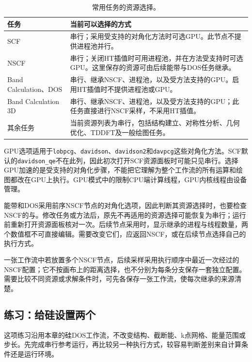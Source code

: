 \begin{table}[!htb]
\centering
\caption{常用任务的资源选择。}
\label{tab:node-resource-support}
\begin{tabularx}{\linewidth}{p{.29\linewidth}X}
\toprule
任务 & 当前可以选择的方式 \\
\midrule
SCF & 串行；采用受支持的对角化方法时可选GPU。此节点不提供进程池并行。\\
NSCF & 串行；关闭HT插值时可用进程池，并在方法受支持时可选GPU。这里保存的资源可由后续能带与DOS任务继承。\\
Band Calculation、DOS & 串行、继承NSCF、进程池，以及受方法支持的GPU。启用HT插值时不提供进程池或GPU。\\
Band Calculation 3D & 串行、继承NSCF、进程池，以及受方法支持的GPU；此任务直接进行NSCF采样，不采用HT插值。\\
其余任务 & 当前资源列表为串行，包括结构建立、对称性分析、几何优化、TDDFT及一般绘图任务。\\
\bottomrule
\end{tabularx}
\end{table}

GPU选项适用于\texttt{lobpcg}、\texttt{davidson}、\texttt{davidson2}和\texttt{davpcg}这些对角化方法。SCF默认的\texttt{davidson\_qe}不在此列，因此初次打开SCF资源面板时可能只见串行。选择GPU加速的是受支持的对角化步骤，不能把它理解为整个工作流的所有运算和绘图都改在GPU上执行。GPU模式中的限制CPU端计算线程，GPU内核线程由设备管理。

能带和DOS采用前序NSCF节点的对角化选项，因此判断其资源选择时，也要检查NSCF的与。修改任务或方法后，原先不再适用的资源选择可能恢复为串行；运行前重新打开资源面板核对一次。后续节点采用时，显示继承的进程与线程数量，两个数值框不可直接编辑。需要改变它们，应返回NSCF，或在后续节点选择自己的执行方式。

一张工作流中若放置多个NSCF节点，后续采样采用执行顺序中最近一次经过的NSCF配置；它不按画布上的距离选择，也不分别为每条分支保存一套独立配置。需要比较不同资源或求解条件时，可先各保存一张工作流，使每次继承的来源清楚。

\subsection{练习：给硅设置两个}

这项练习沿用本章的硅DOS工作流，不改变结构、截断能、k点网格、能量范围或步长。先完成串行参考运行，再比较另一种执行方式，较容易判断差别来自计算条件还是运行环境。

